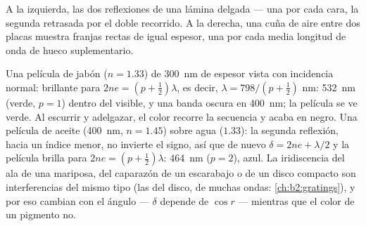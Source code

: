 \begin{omfigure}

{\small A la izquierda, las dos reflexiones de una lámina delgada --- una por cada
cara, la segunda retrasada por el doble recorrido. A la derecha, una cuña de aire
entre dos placas muestra franjas rectas de igual espesor, una por cada
media longitud de onda de hueco suplementario.}
\end{omfigure}

\begin{example}\label{ex:b2:two-wave-interference:colours}
Una película de jabón ($n = 1.33$) de \qty{300}{nm} de espesor vista con incidencia normal:
brillante para $2ne = (p + \tfrac12)\lambda$, es decir, $\lambda = 798/(p + \tfrac12)$ nm: \qty{532}{nm}
(verde, $p = 1$) dentro del visible, y una banda oscura en \qty{400}{nm}; la
película se ve verde. Al escurrir y adelgazar, el color recorre la
secuencia y acaba en negro. Una película de aceite (\qty{400}{nm}, $n = 1.45$) sobre agua
($1.33$): la segunda reflexión, hacia un índice menor, no invierte
el signo, así que de nuevo $\delta = 2ne + \lambda/2$ y la película brilla para $2ne =
(p + \tfrac12)\lambda$: \qty{464}{nm} ($p = 2$), azul. La iridiscencia del ala de una
mariposa, del caparazón de un escarabajo o de un disco compacto son interferencias
del mismo tipo (las del disco, de muchas ondas: \cref{ch:b2:gratings}),
y por eso cambian con el ángulo --- $\delta$ depende de $\cos r$ ---
mientras que el color de un pigmento no.
\end{example}

